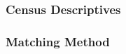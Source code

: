 \documentclass[aspectratio=149]{beamer}
\begin{document}

\begin{frame}
\frametitle{Census Descriptives}

\centering
\resizebox{\textwidth}{!}{  

}

\end{frame}



\begin{frame}
\frametitle{Matching Method}

\centering


\end{frame}
\end{document}
